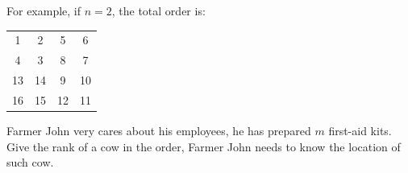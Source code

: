 For example, if $n=2$, the total order is:
\begin{table}[h]
  \centering
  \begin{tabular}{|c c c c|}
    \hline
    1   &   2   &   5   &   6   \\
    4   &   3   &   8   &   7   \\
    13  &   14  &   9   &   10  \\
    16  &   15  &   12  &   11  \\
    \hline
  \end{tabular}
\end{table}


Farmer John very cares about his employees, he has prepared $m$ first-aid kits.
Give the rank of a cow in the order, Farmer John needs to know the location of such cow.
